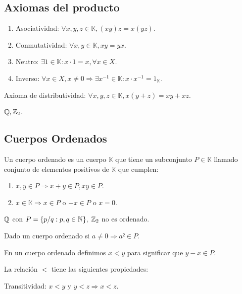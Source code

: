 \subsection{Axiomas del producto}

\begin{enumerate}
    \item Asociatividad: \(\forall x,y,z \in \mathbb{K}, (xy)z=x(yz)\).
    \item Conmutatividad: \(\forall x,y \in \mathbb{K}, xy=yx\).
    \item Neutro: \(\exists 1 \in \mathbb{K} : x \cdot 1 = x, \forall x \in X\).
    \item Inverso: \(\forall x \in X, x \neq 0 \Rightarrow \exists x^{-1} \in \mathbb{K} : x \cdot x^{-1} = 1_\mathbb{K} \).
\end{enumerate}
Axioma de distributividad: \(\forall x,y,z \in \mathbb{K}, x(y+z)=xy+xz\).

\begin{eg}
    \(\mathbb{Q}, \mathbb{Z}_2\).
\end{eg}

\subsection{Cuerpos Ordenados}

Un cuerpo ordenado es un cuerpo \(\mathbb{K} \) que tiene un subconjunto \(P \in \mathbb{K} \) llamado conjunto de elementos positivos de \(\mathbb{K} \) que cumplen:
\begin{enumerate}
    \item \(x,y \in P \Rightarrow x+y \in P, xy \in P\).
    \item \(x \in \mathbb{K} \Rightarrow x \in P\) o \(-x \in P\) o \(x=0\).
\end{enumerate}

\begin{eg}
    \(\mathbb{Q} \) con \(P = \{ p/q:p,q\in \mathbb{N} \} \), \(\mathbb{Z}_2\) no es ordenado.
\end{eg}

\begin{prop}
    Dado un cuerpo ordenado si \(a \neq 0 \Rightarrow a²\in P\).
\end{prop}

En un cuerpo ordenado definimos \(x<y\) para significar que \(y-x\in P\).

La relación \(<\) tiene las siguientes propiedades:

\begin{prop}
    Transitividad: \(x<y\) y \(y<z \Rightarrow x<z\).
\end{prop}

